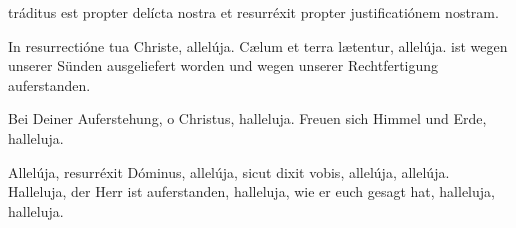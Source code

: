 \documentclass[fontsize=10pt,paper=A5,twoside,BCOR=1mm,DIV=21,headinclude]{scrarticle}
\begin{document}
\vspace{-.3em}


\vspace{-.2em}

\begin{paracol}{2}\pcb
{} tráditus est propter delícta nostra et resurréxit propter justificatiónem nostram.

\V In resurrectióne tua Christe, allelúja.
\R Cælum et terra lætentur, allelúja.
	\switchcolumn
	 ist wegen unserer Sünden ausgeliefert worden und wegen unserer Rechtfertigung auferstanden.

\V Bei Deiner Auferstehung, o Christus, halleluja.
\R Freuen sich Himmel und Erde, halleluja.
\end{paracol}

\vspace{-.2em}


\vspace{.3em}

\begin{paracol}{2}\pcb
\A Allelúja, resurréxit Dóminus, allelúja, sicut dixit vobis, allelúja, allelúja.
	\switchcolumn
	\A Halleluja, der Herr ist auferstanden, halleluja, wie er euch gesagt hat, halleluja, halleluja.
\end{paracol}









\end{document}
